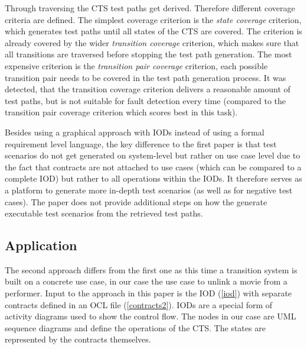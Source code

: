 Through traversing the CTS test paths get derived. Therefore different coverage criteria are defined. The simplest coverage criterion is the \textit{state coverage} criterion, which generates test paths until all states of the CTS are covered. The criterion is already covered by the wider \textit{transition coverage} criterion, which makes sure that all transitions are traversed before stopping the test path generation. The most expensive criterion is the \textit{transition pair coverage} criterion, each possible transition pair needs to be covered in the test path generation process. It was detected, that the transition coverage criterion delivers a reasonable amount of test paths, but is not suitable for fault detection every time (compared to the transition pair coverage criterion which scores best in this task). 

Besides using a graphical approach with IODs instead of using a formal requirement level language, the key difference to the first paper is that test scenarios do not get generated on system-level but rather on use case level due to the fact that contracts are not attached to use cases (which can be compared to a complete IOD) but rather to all operations within the IODs. It therefore serves as a platform to generate more in-depth test scenarios (as well as for negative test cases). The paper does not provide additional steps on how the generate executable test scenarios from the retrieved test paths. 

\subsection{Application}

The second approach differs from the first one as this time a transition system is built on a concrete use case, in our case the use case to unlink a movie from a performer. Input to the approach in this paper is the IOD (\autoref{iod}) with separate contracts defined in an OCL file (\autoref{contracts2}). IODs are a special form of activity diagrams used to show the control flow. The nodes in our case are UML sequence diagrams and define the operations of the CTS. The states are represented by the contracts themselves. 

